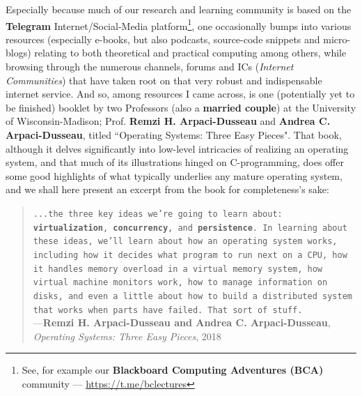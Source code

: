 \documentclass[a4paper, 18pt]{book} %
\begin{document}
{{{\vspace{2em}

Especially because much of our research and learning community is based on the \textbf{Telegram} Internet/Social-Media platform\footnote{See, for example our \textbf{Blackboard Computing Adventures (BCA)} community --- \url{https://t.me/bclectures}}, one occasionally bumps into various resources (especially e-books, but also podcasts, source-code snippets and micro-blogs) relating to both theoretical and practical computing among others, while browsing through the numerous channels, forums and ICs (\textit{Internet Communities}) that have taken root on that very robust and indispensable internet service. And so, among resources I came across, is one (potentially yet to be finished) booklet by two Professors (also a \textbf{married couple}) at the University of Wisconsin-Madison; Prof. \textbf{Remzi H. Arpaci-Dusseau} and \textbf{Andrea C. Arpaci-Dusseau}, titled ``Operating Systems: Three Easy Pieces". That book, although it delves significantly into low-level intricacies of realizing an operating system, and that much of its illustrations hinged on C-programming, does offer some good highlights of what typically underlies any mature operating system, and we shall here present an excerpt from the book for completeness's sake:

\vspace{2em}

\begin{quotation}
\noindent \texttt{...the three key ideas we're going to learn about: \textbf{virtualization}, \textbf{concurrency}, and \textbf{persistence}. In learning about these ideas, we'll learn about how an operating system works, including how it decides what program to run next on a CPU, how it handles memory overload in a virtual memory system, how virtual machine monitors work, how to manage information on disks, and even a little about how to build a distributed system that works when parts have failed. That sort of stuff.}\\
\hspace*{\fill} ---\textbf{Remzi H. Arpaci-Dusseau and Andrea C. Arpaci-Dusseau}, \textit{Operating Systems: Three Easy Pieces}, 2018\cite{arpacidusseau2018ostep}
\end{quotation}


\vspace{2em}

}}}
\end{document}
